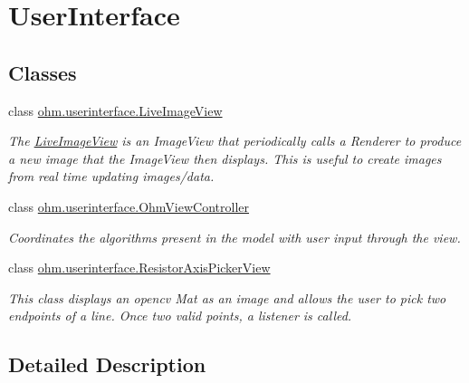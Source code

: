 \hypertarget{group___user_interface}{}\section{User\+Interface}
\label{group___user_interface}
\subsection*{Classes}
\begin{DoxyCompactItemize}
\item 
class \hyperlink{classohm_1_1userinterface_1_1_live_image_view}{ohm.\+userinterface.\+Live\+Image\+View}
\begin{DoxyCompactList}\small\item\em The \hyperlink{classohm_1_1userinterface_1_1_live_image_view}{Live\+Image\+View} is an Image\+View that periodically calls a Renderer to produce a new image that the Image\+View then displays. This is useful to create images from real time updating images/data. \end{DoxyCompactList}\item 
class \hyperlink{classohm_1_1userinterface_1_1_ohm_view_controller}{ohm.\+userinterface.\+Ohm\+View\+Controller}
\begin{DoxyCompactList}\small\item\em Coordinates the algorithms present in the model with user input through the view. \end{DoxyCompactList}\item 
class \hyperlink{classohm_1_1userinterface_1_1_resistor_axis_picker_view}{ohm.\+userinterface.\+Resistor\+Axis\+Picker\+View}
\begin{DoxyCompactList}\small\item\em This class displays an opencv Mat as an image and allows the user to pick two endpoints of a line. Once two valid points, a listener is called. \end{DoxyCompactList}\end{DoxyCompactItemize}


\subsection{Detailed Description}
